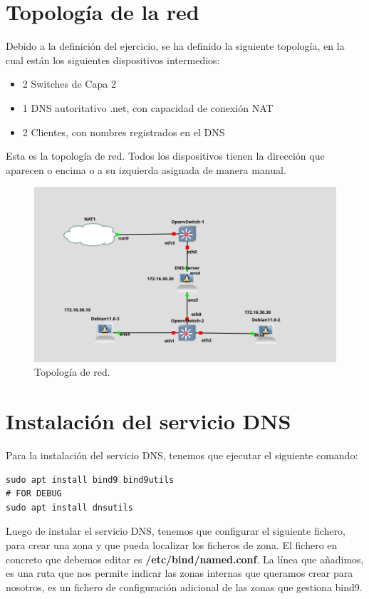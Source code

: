 \section{Topología de la red}

Debido a la definición del ejercicio, se ha definido la siguiente topología, en la cual están los siguientes dispositivos intermedios:

\begin{itemize}
    \item 2 Switches de Capa 2
    \item 1 DNS autoritativo .net, con capacidad de conexión NAT
    \item 2 Clientes, con nombres registrados en el DNS
\end{itemize}

Esta es la topología de red. Todos los dispositivos tienen la dirección que aparecen o encima o a su izquierda asignada de manera manual.

\begin{figure}[H]
	\centering
	\includegraphics[scale=0.30]{00}
	\caption{Topología de red.}
\end{figure}

\section{Instalación del servicio DNS}

Para la instalación del servicio DNS, tenemos que ejecutar el siguiente comando:

\begin{lstlisting}[style=mybash]
sudo apt install bind9 bind9utils
# FOR DEBUG
sudo apt install dnsutils
\end{lstlisting}

Luego de instalar el servicio DNS, tenemos que configurar el siguiente fichero, para crear una zona y que pueda localizar los ficheros de zona. El fichero en concreto que debemos editar es \textbf{/etc/bind/named.conf}. La línea que añadimos, es una ruta que nos permite indicar las zonas internas que queramos crear para nosotros, es un fichero de configuración adicional de las zonas que gestiona bind9.

